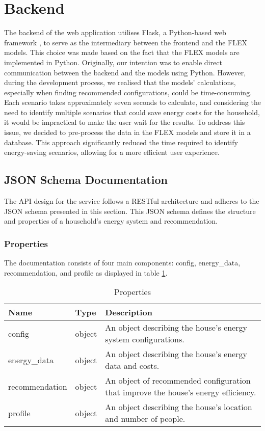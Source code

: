 \section{Backend}

The backend of the web application utilises Flask, a Python-based web framework \cite{flask}, to serve as the intermediary between the frontend and the FLEX models. 
This choice was made based on the fact that the FLEX models are implemented in Python. 
Originally, our intention was to enable direct communication between the backend and the models using Python. 
However, during the development process, we realised that the models' calculations, especially when finding recommended configurations, could be time-consuming. 
Each scenario takes approximately seven seconds to calculate, and considering the need to identify multiple scenarios that could save energy costs for the household, 
it would be impractical to make the user wait for the results. 
To address this issue, we decided to pre-process the data in the FLEX models and store it in a database. 
This approach significantly reduced the time required to identify energy-saving scenarios, allowing for a more efficient user experience.


\subsection{JSON Schema Documentation}

The API design for the service follows a RESTful architecture and adheres to the JSON schema presented in this section. 
This JSON schema defines the structure and properties of a household's energy system and recommendation.


\subsubsection{Properties}

The documentation consists of four main components: config, energy\_data, recommendation, and profile as displayed in table \ref{tab:properties}. 

\begin{table}[h!]
    \centering
    \scriptsize
    \begin{tabular}{ | p{} | p{} | p{} | } 
      \hline
      Name & Type & Description \\
      \hline
      config & object & An object describing the house's energy system configurations. \\
      \hline
      energy\_data & object & An object describing the house's energy data and costs. \\
      \hline
      recommendation & object & An object of recommended configuration that improve the house's energy efficiency. \\
      \hline
      profile & object & An object describing the house's location and number of people. \\
      \hline
    \end{tabular}
    \caption{Properties}
    \label{tab:properties}
\end{table}


